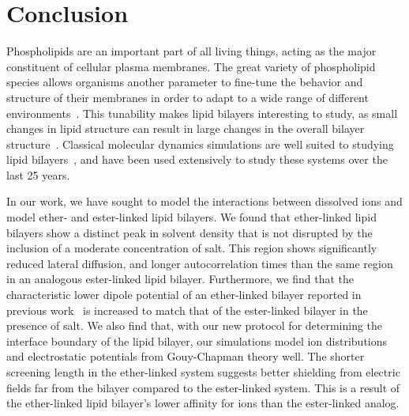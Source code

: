 \documentclass[12pt,openany,final]{book}
\begin{document}
\chapter{Conclusion}
Phospholipids are an important part of all living things, acting as the major constituent of cellular plasma membranes. 
The great variety of phospholipid species allows organisms another parameter
to fine-tune the behavior and structure of their membranes in order to adapt to a wide range of different
environments~\cite{van:2008:lipidvariety}. This tunability makes lipid bilayers interesting to study, as small changes in 
lipid structure can result in large changes in the overall bilayer structure~\cite{pandit:2008:simulationtextbook}.
Classical molecular dynamics simulations are well suited to studying lipid bilayers~\cite{pandit:2008:simulationtextbook}, and have been used extensively
to study these systems over the last 25 years.

In our work, we have sought to model the interactions between dissolved ions and model ether- and ester-linked lipid bilayers.
We found that ether-linked lipid bilayers show a distinct peak in solvent density
that is not disrupted by the inclusion of a moderate concentration of salt. This region
shows significantly reduced lateral diffusion, and longer autocorrelation times than the same
region in an analogous ester-linked lipid bilayer. Furthermore, we find that
the characteristic lower dipole potential of an ether-linked bilayer reported in previous work~\cite{kruczek:2017:ether} is 
increased to match that of the ester-linked bilayer in the presence of salt. We also find that,
with our new protocol for determining the interface boundary of the lipid bilayer,
our simulations model ion distributions and electrostatic potentials from Gouy-Chapman theory well. 
The shorter screening length in the
ether-linked system suggests better shielding from electric fields far 
from the bilayer compared to the ester-linked system. This is a result
of the ether-linked lipid bilayer's lower affinity for ions than the ester-linked analog.

\end{document}
